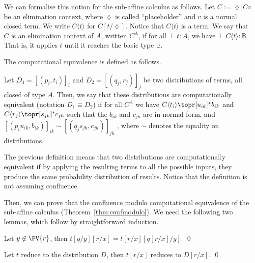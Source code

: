 We can formalise this notion for the sub-affine calculus as follows. Let 
\(
  C := \lozenge\mid Cv
\)
be an elimination context, where $\lozenge$ is called ``placeholder'' and $v$ is a normal closed term. We write $C\langle t\rangle$ for $C[t/\lozenge]$. Notice that $C\langle t\rangle$ is a term. We say that $C$ is an elimination context of $A$, written $C^A$, if for all $\vdash t:A$, we have $\vdash C\langle t\rangle:\mathbb B$. That is, it applies $t$ until it reaches the basic type $\mathbb B$.

The computational equivalence is defined as follows.
\begin{defin}
Let $D_1 = [(p_i,t_i)]_i$ and $D_2 = [(q_j,r_j)]_j$ be two distributions of
terms, all closed of type $A$. Then, we say that these distributions are
computationally equivalent (notation $D_1\equiv D_2$) if for all $C^A$ we have
$C\langle t_i\rangle\topr[u_{ik}]^* b_{ik}$ and $C\langle r_j\rangle\topr[s_{jh}]^* c_{jh}$ such that the
$b_{ik}$ and $c_{jh}$ are in normal form, and  $[(p_iu_{ik},b_{ik})]_{ik} \sim
[(q_js_{jh},c_{jh})]_{jh}$
, where $\sim$ denotes the equality on distributions.
\end{defin}
The previous definition means that two distributions are computationally equivalent if by applying the resulting terms to all the possible inputs, they produce the same probability distribution of results. Notice that the definition is not assuming confluence. 

Then, we can prove that the confluence modulo computational equivalence of the sub-affine calculus (Theorem~\ref{thm:confmodulo}). We need the following two lemmas, which follow by straightforward induction.
\begin{lem}\label{lem:subst}
Let $y\not\in\FV{r}$, then $t[q/y][r/x]= t[r/x][q[r/x]/y]$.
\qed
\end{lem}

\begin{lem}\label{lem:distRed}
Let $t$ reduce to the distribution $D$, then $t[r/x]$ reduces to $D[r/x]$.
\qed
\end{lem}

